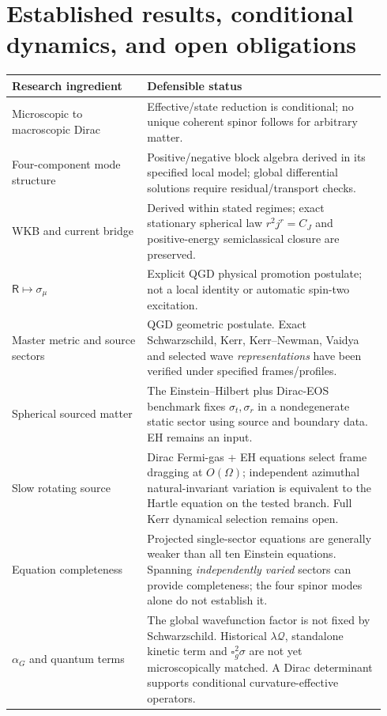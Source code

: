 \documentclass[11pt,a4paper]{article}
\begin{document}
\section{Established results, conditional dynamics, and open obligations}\label{sec:status}
\renewcommand{\arraystretch}{1.16}
\begin{longtable}{@{}p{0.34\linewidth}p{0.60\linewidth}@{}}
\toprule
Research ingredient & Defensible status\\\midrule\endhead
Microscopic to macroscopic Dirac & Effective/state reduction is conditional; no unique coherent spinor follows for arbitrary matter.\\
Four-component mode structure & Positive/negative block algebra derived in its specified local model; global differential solutions require residual/transport checks.\\
WKB and current bridge & Derived within stated regimes; exact stationary spherical law $r^2j^r=C_J$ and positive-energy semiclassical closure are preserved.\\
$\mathsf R\mapsto\sigma_\mu$ & Explicit QGD physical promotion postulate; not a local identity or automatic spin-two excitation.\\
Master metric and source sectors & QGD geometric postulate. Exact Schwarzschild, Kerr, Kerr--Newman, Vaidya and selected wave \emph{representations} have been verified under specified frames/profiles.\\
Spherical sourced matter & The Einstein--Hilbert plus Dirac-EOS benchmark fixes $\sigma_t,\sigma_r$ in a nondegenerate static sector using source and boundary data. EH remains an input.\\
Slow rotating source & Dirac Fermi-gas + EH equations select frame dragging at $O(\Omega)$; independent azimuthal natural-invariant variation is equivalent to the Hartle equation on the tested branch. Full Kerr dynamical selection remains open.\\
Equation completeness & Projected single-sector equations are generally weaker than all ten Einstein equations. Spanning \emph{independently varied} sectors can provide completeness; the four spinor modes alone do not establish it.\\
$\alpha_G$ and quantum terms & The global wavefunction factor is not fixed by Schwarzschild. Historical $\lambda\mathcal Q$, standalone kinetic term and $\square_g^2\sigma$ are not yet microscopically matched. A Dirac determinant supports conditional curvature-effective operators.\\

\end{longtable}
\end{document}
